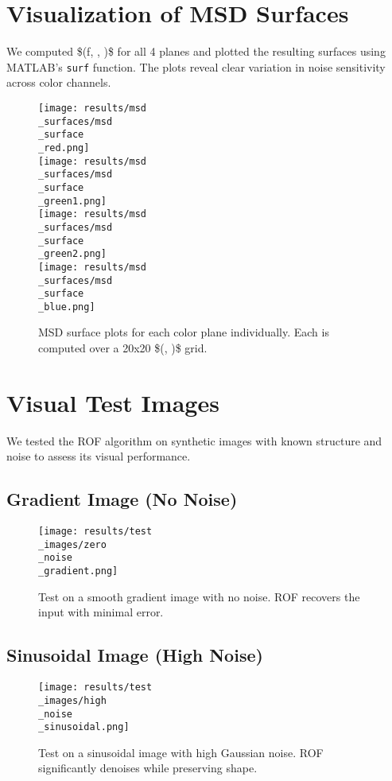 \documentclass[11pt]{article}
\begin{document}
\section{Visualization of MSD Surfaces}
We computed \$(f, \lambda, \epsilon)\$ for all 4 planes and plotted the resulting surfaces using MATLAB's \texttt{surf} function. The plots reveal clear variation in noise sensitivity across color channels.

\begin{figure}[h!]
\centering
\texttt{[image: results/msd\\\_surfaces/msd\\\_surface\\\_red.png]} \\
\texttt{[image: results/msd\\\_surfaces/msd\\\_surface\\\_green1.png]} \\
\texttt{[image: results/msd\\\_surfaces/msd\\\_surface\\\_green2.png]} \\
\texttt{[image: results/msd\\\_surfaces/msd\\\_surface\\\_blue.png]}
\caption{MSD surface plots for each color plane individually. Each is computed over a 20x20 \$(\lambda, \epsilon)\$ grid.}
\end{figure}

\section{Visual Test Images}
We tested the ROF algorithm on synthetic images with known structure and noise to assess its visual performance.

\subsection{Gradient Image (No Noise)}
\begin{figure}[h!]
\centering
\texttt{[image: results/test\\\_images/zero\\\_noise\\\_gradient.png]}
\caption{Test on a smooth gradient image with no noise. ROF recovers the input with minimal error.}
\end{figure}

\subsection{Sinusoidal Image (High Noise)}
\begin{figure}[h!]
\centering
\texttt{[image: results/test\\\_images/high\\\_noise\\\_sinusoidal.png]}
\caption{Test on a sinusoidal image with high Gaussian noise. ROF significantly denoises while preserving shape.}
\end{figure}
\end{document}
